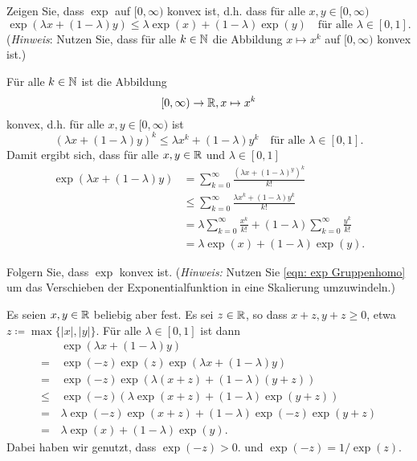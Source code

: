\documentclass[a4paper,10pt]{article}
\begin{document}
\begin{question}
 Zeigen Sie, dass $\exp$ auf $[0,\infty)$ konvex ist, d.h. dass für alle $x,y \in [0,\infty)$
 \[
  \exp(\lambda x + (1-\lambda) y)
  \leq \lambda \exp(x) + (1-\lambda) \exp(y)
  \quad
  \text{für alle $\lambda \in [0,1]$}.
 \]
 (\emph{Hinweis}: Nutzen Sie, dass für alle $k \in \mathbb{N}$ die Abbildung $x \mapsto x^k$ auf $[0,\infty)$ konvex ist.)
\end{question}
\begin{solution}
 Für alle $k \in \mathbb{N}$ ist die Abbildung
 \[
  [0, \infty) \to \mathbb{R}, x \mapsto x^k
 \]
 konvex, d.h. für alle $x,y \in [0,\infty)$ ist
 \[
  (\lambda x + (1-\lambda) y)^k
  \leq \lambda x^k + (1-\lambda) y^k
  \quad
  \text{für alle $\lambda \in [0,1]$}.
 \]
 Damit ergibt sich, dass für alle $x,y \in \mathbb{R}$ und $\lambda \in [0,1]$
 \begin{align*}
  \exp(\lambda x + (1-\lambda) y)
  &= \sum_{k=0}^\infty \frac{(\lambda x + (1-\lambda)^y)^k}{k!} \\
  &\leq \sum_{k=0}^\infty \frac{\lambda x^k + (1-\lambda) y^k}{k!} \\
  &= \lambda \sum_{k=0}^\infty \frac{x^k}{k!} + (1-\lambda) \sum_{k=0}^\infty \frac{y^k}{k!} \\
  &= \lambda \exp(x) + (1-\lambda) \exp(y).
 \end{align*}
\end{solution}



\begin{question}
 Folgern Sie, dass $\exp$ konvex ist. (\emph{Hinweis:} Nutzen Sie \eqref{eqn: exp Gruppenhomo} um das Verschieben der Exponentialfunktion in eine Skalierung umzuwindeln.)
\end{question}
\begin{solution}
 Es seien $x,y \in \mathbb{R}$ beliebig aber fest. Es sei $z \in \mathbb{R}$, so dass $x+z, y+z \geq 0$, etwa $z \coloneqq \max\{|x|,|y|\}$. Für alle $\lambda \in [0,1]$ ist dann
 \begin{align*}
      &\, \exp(\lambda x + (1-\lambda) y) \\
     =&\,  \exp(-z) \exp(z) \exp(\lambda x + (1-\lambda) y) \\
     =&\,  \exp(-z) \exp(\lambda (x+z) + (1-\lambda) (y+z)) \\
  \leq&\,  \exp(-z) \left( \lambda \exp(x+z) + (1-\lambda) \exp(y+z) \right) \\
     =&\,  \lambda \exp(-z) \exp(x+z) + (1-\lambda) \exp(-z) \exp(y+z) \\
     =&\,  \lambda \exp(x) + (1-\lambda) \exp(y).
 \end{align*}
 Dabei haben wir genutzt, dass $\exp(-z) > 0$. und $\exp(-z) = 1/\exp(z)$.
\end{solution}







\newpage


\printsolutions
\end{document}
